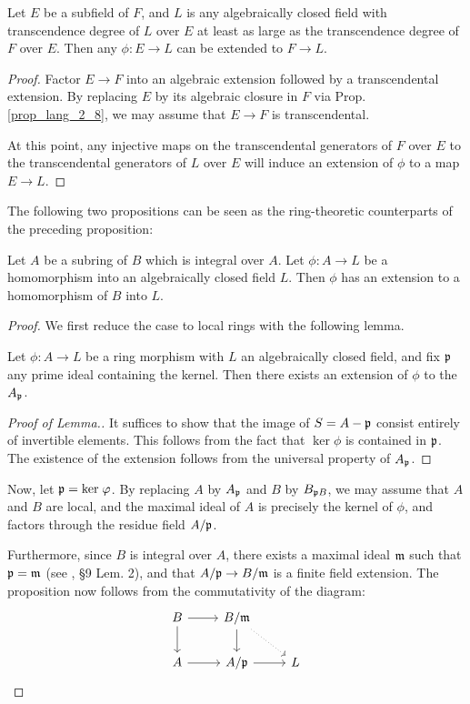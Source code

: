 \begin{prop}
Let $E$ be a subfield of $F$, and $L$ is any algebraically closed
field with transcendence degree of $L$ over $E$ at least as large 
as the transcendence degree of $F$ over $E$. Then any $\phi: E \to 
L$ can be extended to $F \to L$.
\end{prop}
\begin{proof}
Factor $E \to F$ into an algebraic extension followed by a 
transcendental extension. By replacing $E$ by its algebraic 
closure in $F$ via Prop. \ref{prop_lang_2_8}, we may assume that 
$E \to F$ is transcendental.

At this point, any injective maps on the transcendental generators 
of $F$ over $E$ to the transcendental generators of $L$ over $E$
will induce an extension of $\phi$ to a map $E \to L$.
\end{proof}

The following two propositions can be seen as the ring-theoretic
counterparts of the preceding proposition:

\begin{prop}\label{prop_lang_3_1}
Let $A$ be a subring of $B$ which is integral over $A$. Let
$\phi: A \to L$ be a homomorphism into an algebraically closed 
field $L$. Then $\phi$ has an extension to a homomorphism of $B$
into $L$.
\end{prop}

\begin{proof}
We first reduce the case to local rings with the following lemma.

\begin{lem}\label{lem_lang_3_1}
Let $\phi : A \to L$ be a ring morphism with $L$ an algebraically
closed field, and fix $\mathfrak{p}$ any prime ideal containing the
kernel. Then there exists an extension of $\phi$ to the 
$A_{\mathfrak{p}}$.
\end{lem}
\begin{proof}[Proof of Lemma.]
It suffices to show that the image of $S = A - \mathfrak{p}$ consist
entirely of invertible elements. This follows from the fact that
$\ker \phi$ is contained in $\mathfrak{p}$. The existence of the
extension follows from the universal property of $A_{\mathfrak{p}}$.
\end{proof}

Now, let $\mathfrak{p} = \mathrm{ker}\; \varphi$. By replacing $A$ by $A_{\mathfrak{p}}$
and $B$ by $B_{\mathfrak{p}B}$, we may assume that $A$ and $B$ are
local, and the maximal ideal of $A$ is precisely the kernel of $\phi$,
and factors through the residue field $A/\mathfrak{p}$.

Furthermore, since $B$ is integral over $A$, there exists a maximal
ideal $\mathfrak{m}$ such that $\mathfrak{p} = \mathfrak{m}$ (see 
\cite{MatsCA}, \S9 Lem. 2), and that $A/\mathfrak{p} \to B/\mathfrak{m}$ is
a finite field extension. The proposition now follows from the
commutativity of the diagram:
\[
\begin{tikzcd}
B \arrow{r} \arrow{d} 
& B/\ideal{m} \arrow{d} \arrow[dotted]{rd} \\
A \arrow{r} 
& A/\ideal{p} \arrow{r}
& L
\end{tikzcd}
\]
\end{proof}

